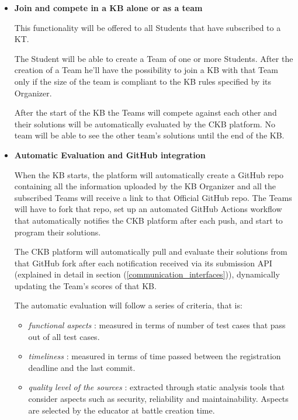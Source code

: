 \documentclass[11pt]{report}
\begin{document}
\begin{itemize}
    This functionality will be offered to all Students registered to the CKB platform.

    After the creation of a KT, every student will be able to see the new tournament and will have the 
    possibility to subscribe. 

    Subscribing to a KT means that the user will be part of the rankings of that KT\@.
    His rank will depend on the sum of the scores obtained in each KB that he joined for that KT\@.

    \item \textbf{Join and compete in a KB alone or as a team}

    This functionality will be offered to all Students that have subscribed to a KT\@.

    The Student will be able to create a Team of one or more Students.
    After the creation of a Team he'll have the possibility to join a KB with that Team only if the size of the team is compliant to the KB
    rules specified by its Organizer.

    After the start of the KB the Teams will compete against each other and their solutions
    will be automatically evaluated by the CKB platform.
    No team will be able to see the other team's solutions until the end of the KB\@.

    \item \textbf{Automatic Evaluation and GitHub integration}

    When the KB starts, the platform will automatically create a GitHub repo containing all the information uploaded by
    the KB Organizer and all the subscribed Teams will receive a link to that Official GitHub repo.
    The Teams will have to fork that repo, set up an automated GitHub Actions workflow that automatically notifies
    the CKB platform after each push, and start to program their solutions.

    The CKB platform will automatically pull and evaluate their solutions from that GitHub fork after
    each notification received via its submission API (explained in detail in section (\ref{communication_interfaces})), dynamically updating the Team's scores of that KB\@.

    The automatic evaluation will follow a series of criteria, that is:
    \begin{itemize}
        \item \emph{functional aspects} : measured in terms of number of test cases that pass out of all test cases.
        \item \emph{timeliness} : measured in terms of time passed between the registration deadline and the last commit.
        \item \emph{quality level of the sources} : extracted through static analysis tools that consider aspects such as
        security, reliability and maintainability. Aspects are selected by the educator at battle creation time.
    \end{itemize}


\end{itemize}
\end{document}
